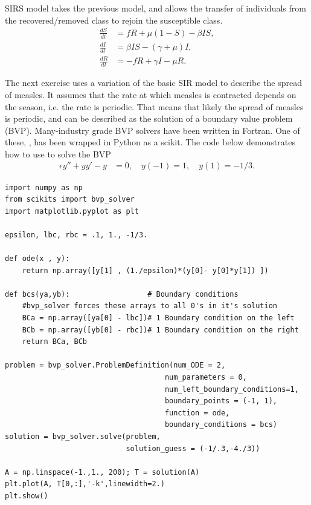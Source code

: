 SIRS model takes the previous model, and allows the transfer of individuals from the recovered/removed class to rejoin the susceptible class. 
\begin{align*}
\frac{dS}{dt} &= fR + \mu(1 -S) - \beta I S,\\
\frac{dI}{dt} &= \beta I S - (\gamma + \mu)I, \\
\frac{dR}{dt} &= -fR + \gamma I - \mu R.
\end{align*}

The next exercise uses a variation of the basic SIR model to describe the spread of measles. 
It assumes that the rate at which measles is contracted depends on the season, i.e. the rate is periodic. That means that likely the spread of measles is periodic, and can be described as the solution of a boundary value problem (BVP).
Many-industry grade BVP solvers have been written in Fortran. One of these, , has been wrapped in Python as a scikit. The code below demonstrates how to use  to solve the BVP
\begin{align*}
	\epsilon y'' + yy' - y &= 0, \quad y(-1) = 1, \quad y(1) = -1/3.
\end{align*}

\begin{lstlisting}
import numpy as np
from scikits import bvp_solver
import matplotlib.pyplot as plt

epsilon, lbc, rbc = .1, 1., -1/3.

def ode(x , y):
	return np.array([y[1] , (1./epsilon)*(y[0]- y[0]*y[1]) ]) 

def bcs(ya,yb): 				 # Boundary conditions
    #bvp_solver forces these arrays to all 0's in it's solution
	BCa = np.array([ya[0] - lbc])# 1 Boundary condition on the left
	BCb = np.array([yb[0] - rbc])# 1 Boundary condition on the right
	return BCa, BCb

problem = bvp_solver.ProblemDefinition(num_ODE = 2,
                                     num_parameters = 0,
                                     num_left_boundary_conditions=1,
                                     boundary_points = (-1, 1),
                                     function = ode,
                                     boundary_conditions = bcs)
solution = bvp_solver.solve(problem,
                            solution_guess = (-1/.3,-4./3))

A = np.linspace(-1.,1., 200); T = solution(A)
plt.plot(A, T[0,:],'-k',linewidth=2.)
plt.show()

\end{lstlisting}

